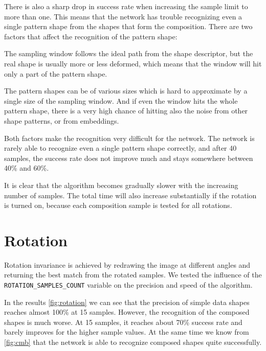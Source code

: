 There is also a sharp drop in success rate when increasing the sample limit to more than one. This means that the network has trouble recognizing even a single pattern shape from the shapes that form the composition. There are two factors that affect the recognition of the pattern shape:
\begin{description}
\item The sampling window follows the ideal path from the shape descriptor, but the real shape is usually more or less deformed, which means that the window will hit only a part of the pattern shape.
\item The pattern shapes can be of various sizes which is hard to approximate by a single size of the sampling window. And if even the window hits the whole pattern shape, there is a very high chance of hitting also the noise from other shape patterns, or from embeddings.
\end{description}
Both factors make the recognition very difficult for the network. The network is rarely able to recognize even a single pattern shape correctly, and after 40 samples, the success rate does not improve much and stays somewhere between 40\% and 60\%.

It is clear that the algorithm becomes gradually slower with the increasing number of samples. The total time will also increase substantially if the rotation is turned on, because each composition sample is tested for all rotations.

\section{Rotation}
Rotation invariance is achieved by redrawing the image at different angles and returning the best match from the rotated samples. We tested the influence of the \texttt{ROTATION\_SAMPLES\_COUNT} variable on the precision and speed of the algorithm. 

In the results \cref{fig:rotation} we can see that the precision of simple data shapes reaches almost 100\% at 15 samples. However, the recognition of the composed shapes is much worse. At 15 samples, it reaches about 70\% success rate and barely improves for the higher sample values. At the same time we know from \cref{fig:cmb} that the network is able to recognize composed shapes quite successfully. 

